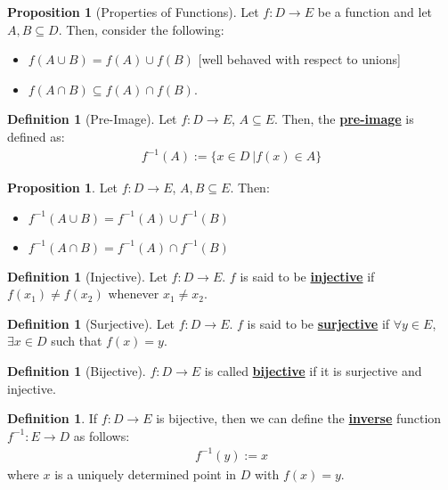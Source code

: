 \documentclass[reqno,11pt]{amsart}
\theoremstyle{definition}
\newtheorem{prop}[theorem]{Proposition}
\theoremstyle{definition}
\newtheorem{definition}[theorem]{Definition}
\theoremstyle{remark}
\newcommand{\dfn}[1]{\underline{\textbf{#1}}}
\begin{document}
\begin{prop}[Properties of Functions]
	Let $f: D \rightarrow E$ be a function and let $A, B \subseteq D$. Then, consider the following: 
	\begin{itemize}[noitemsep]
		\item $f(A \cup B) = f(A) \cup f(B)$ [well behaved with respect to unions]
		\item $f( A \cap B) \subseteq f(A) \cap f(B)$. 
	\end{itemize}
\end{prop}

\begin{definition}[Pre-Image]
	Let $f: D \rightarrow E$, $A \subseteq E$. Then, the \dfn{pre-image} is defined as: 
	\begin{align}
		f^{-1}(A) := \{ x \in D\ | 	f(x) \in A \} 
	\end{align}
\end{definition}

\begin{prop}
	Let $f: D \rightarrow E$, $A, B \subseteq E$. Then: 
	\begin{itemize}[noitemsep]
		\item $f^{-1}(A \cup B) = f^{-1} (A) \cup f^{-1}(B) $
		\item $f^{-1}(A \cap B) = f^{-1}(A) \cap f^{-1}(B)$
	\end{itemize}
\end{prop}

\begin{definition}[Injective]
	Let $f: D \rightarrow E$. $f$ is said to be \dfn{injective} if $f(x_1) \neq f(x_2)$ whenever $x_1 \neq x_2$. 
\end{definition}

\begin{definition}[Surjective]
	Let $f: D \rightarrow E$. $f$ is said to be \dfn{surjective} if $\forall y \in E$, $\exists x \in D$ such that $f(x) = y$.
\end{definition}


\begin{definition}[Bijective]
	$f: D \rightarrow E$ is called \dfn{bijective} if it is surjective and injective.
\end{definition}

\begin{definition}
	If $f: D \rightarrow E$ is bijective, then we can define the \dfn{inverse} function $f^{-1}: E \rightarrow D$ as follows: 
	\begin{align} 
		f^{-1}(y) :=x	
	\end{align}
	where $x$ is a uniquely determined point in $D$ with $f(x)  = y$. 
\end{definition}
\end{document}
